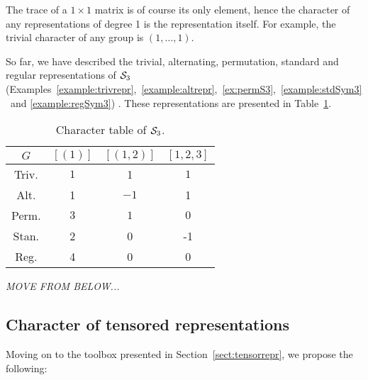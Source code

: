 \begin{example}
	The  trace of a $1 \times 1$ matrix is of course its only element, hence the character of any representations of degree 1 is the representation itself.
	For example,  the trivial character of any group is $(1, \dots, 1)$. 
\end{example}

\begin{example}
	So far, we have described the trivial, alternating, permutation, standard and regular representations of $\mathcal{S}_3$ (Examples~\ref{example:trivrepr},~\ref{example:altrepr},~\ref{ex:permS3},~\ref{example:stdSym3}~and \ref{example:regSym3}) . These representations are presented in Table~\ref{table:chartableSym3}.
	\begin{table}[hbt!]
	\centering
	\begin{tabular}{c | c c c }
		 $G$  & $[(1)]$ & $[(1,2)]$ & $[1,2,3]$ \\ \hline
		Triv. & $1$     & 1         & $1$       \\
		Alt.  & 1       & $-1$      & 1         \\
		Perm. & $3$     & $1$       & $0$       \\
		Stan. & 2       & 0         & -1        \\
		Reg.  & 4       & 0         & 0
	\end{tabular}
	\caption{Character table of $\mathcal{S}_3$.}
	\label{table:chartableSym3}
\end{table}
\end{example}

\begin{example}
	\textit{MOVE FROM BELOW...}
\end{example}

\subsection{Character of tensored representations}

Moving on to the toolbox presented in Section~\ref{sect:tensorrepr}, we propose the following:


